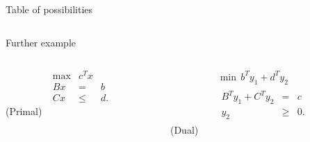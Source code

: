 \begin{frame}{Table of possibilities}

  \begin{columns}
    \begin{column}{.5\textwidth}
      
    \end{column}
    \begin{column}{.5\textwidth}
      
    \end{column}       
  \end{columns}
\end{frame}





\begin{frame}{Further example}



  
  \begin{columns}
    \begin{column}{.5\textwidth}
      \begin{equation*}
        \begin{array}{rcl}
          \max &c^Tx \\
          Bx &  =&  b\\
          Cx & \leq & d. 
        \end{array}
      \end{equation*}
      (Primal)
    \end{column}
    \begin{column}{.5\textwidth}
      \begin{equation*}
        \begin{array}{c}
          \min \, b^Ty_1 + d^T y_2 \\
          \begin{array}{rcl}
            B^Ty_1 + C^T  y_2 & = &  c \\  y_2& \geq & 0. 
          \end{array}
        \end{array}
      \end{equation*}
      (Dual)
    \end{column}       
  \end{columns}
\end{frame}





\begin{frame}{}

  \begin{columns}
    \begin{column}{.5\textwidth}
      
    \end{column}
    \begin{column}{.5\textwidth}
      
    \end{column}       
  \end{columns}
\end{frame}



